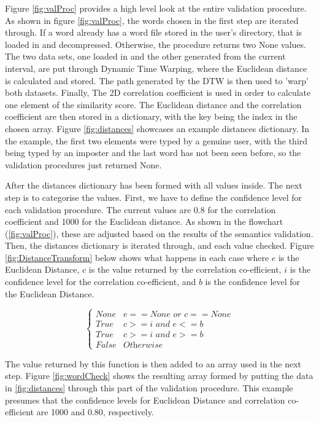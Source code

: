 \documentclass[10pt,a4paper]{report}
\begin{document}
Figure \ref{fig:valProc} provides a high level look at the entire validation procedure. As shown in figure \ref{fig:valProc}, the words chosen in the first step are iterated through. If a word already has a word file stored in the user's directory, that is loaded in and decompressed. Otherwise, the procedure returns two None values. The two data sets, one loaded in and the other generated from the current interval, are put through Dynamic Time Warping, where the Euclidean distance is calculated and stored. The path generated by the DTW is then used to 'warp' both datasets. Finally, The 2D correlation coefficient is used in order to calculate one element of the similarity score. The Euclidean distance and the correlation coefficient are then stored in a dictionary, with the key being the index in the chosen array. Figure \ref{fig:distances} showcases an example distances dictionary. In the example, the first two elements were typed by a genuine user, with the third being typed by an imposter and the last word has not been seen before, so the validation procedures just returned None.

After the distances dictionary has been formed with all values inside. The next step is to categorise the values. First, we have to define the confidence level for each validation procedure. The current values are 0.8 for the correlation coefficient and 1000 for the Euclidean distance. As shown in the flowchart (\ref{fig:valProc}), these are adjusted based on the results of the semantics validation. Then, the distances dictionary is iterated through, and each value checked. Figure \ref{fig:DistanceTransform} below shows what happens in each case where \(e\) is the Euclidean Distance, \(c\) is the value returned by the correlation co-efficient, \(i\) is the confidence level for the correlation co-efficient, and \(b\) is the confidence level for the Euclidean Distance.

\begin{equation}
	\begin{cases}
		\textit{None} & e == \textit{None or } c == \textit{None} \\
		\textit{True} & c >= i \textit{ and } e <= b \\
		\textit{True} & c >= i \textit{ and } e >= b \\
		\textit{False} & \textit{Otherwise}
	\end{cases}
	\label{fig:DistanceTransform}
\end{equation}

The value returned by this function is then added to an array used in the next step. Figure \ref{fig:wordCheck} shows the resulting array formed by putting the data in \ref{fig:distances} through this part of the validation procedure. This example presumes that the confidence levels for Euclidean Distance and correlation co-efficient are 1000 and 0.80, respectively.
\end{document}
